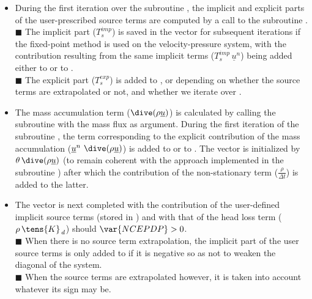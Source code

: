 \begin{itemize}
\item During the first iteration over the subroutine , the implicit and explicit parts of the user-prescribed source terms are computed by a call to the subroutine .\\
{\tiny$\blacksquare$} The implicit part ($T_s^{imp}$) is saved in the vector  for subsequent iterations if the fixed-point method is used on the velocity-pressure system, with the contribution resulting from the same implicit terms ($T_s^{imp}\,\underline{u}^n$) being added either to  or to .\\
{\tiny$\blacksquare$} The explicit part ($T_s^{exp}$) is added to ,  or  depending on whether the source terms are extrapolated or not, and whether we iterate over .\\

\item The mass accumulation term ($\dive(\rho \underline {u})$) is calculated by calling the subroutine  with the mass flux as argument. During the first iteration of the subroutine ,
the term corresponding to the explicit contribution of the mass accumulation ($\underline{u}^{n}\ \dive(\rho \underline{u})$) is added to  or to . The vector  is initialized by $\theta\,\dive(\rho \underline{u})$ (to remain coherent with the approach implemented in the subroutine
) after which the contribution of the non-stationary term ($\displaystyle
\frac{\rho}{\Delta t}$) is added to the latter.\\

\item The vector  is next completed with the contribution of the user-defined implicit source terms (stored in ) and with that of the head loss term ($\rho\,\tens{K}_{\,d}$) should $\var{NCEPDP}>0$.\\
{\tiny$\blacksquare$} When there is no source term extrapolation, the implicit part of the user source terms is  only added to  if it is negative so as not to weaken the diagonal of the system.\\
{\tiny$\blacksquare$} When the source terms are extrapolated however, it is taken into account whatever its sign may be.\\


\end{itemize}
